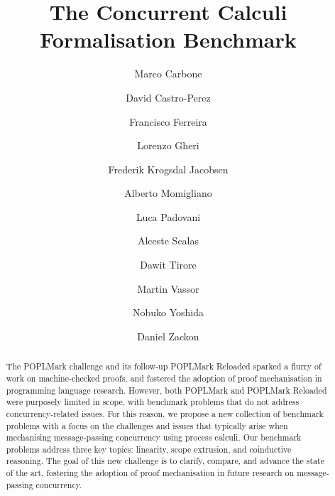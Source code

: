 \documentclass[runningheads]{llncs}
\begin{document}
\title{The Concurrent Calculi Formalisation Benchmark}

\author{
     Marco Carbone 
\and David Castro-Perez 
\and Francisco Ferreira 
\and Lorenzo Gheri 
\and Frederik Krogsdal Jacobsen 
\and Alberto Momigliano 
\and Luca Padovani 
\and Alceste Scalas 
\and Dawit Tirore 
\and Martin Vassor 
\and Nobuko Yoshida 
\and Daniel Zackon 
}



\maketitle

\begin{abstract}
  The POPLMark challenge and its follow-up POPLMark Re\-loaded sparked a flurry of
  work on machine-checked proofs, and fostered the adoption of proof
  mechanisation in programming language research.  However, both POPLMark and
  POPLMark Reloaded were purposely limited in scope, with benchmark problems
  that do not address concurrency-related issues.
  For this reason, we propose a new collection of benchmark problems with a
  focus on the challenges and issues that typically arise when mechanising
  message-passing concurrency using process calculi.  Our benchmark problems
  address three key topics: linearity, scope extrusion, and coinductive
  reasoning.  The goal of this new challenge is to clarify, compare, and advance
  the state of the art, fostering the adoption of proof mechanisation in future
  research on message-passing concurrency.

\end{abstract}
\end{document}
